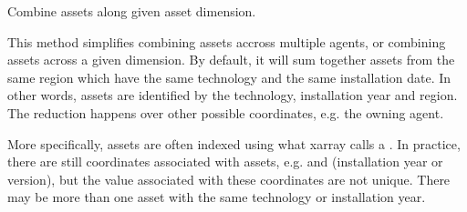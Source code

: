 \documentclass[letterpaper,10pt,english]{sphinxmanual}
\begin{document}

\begin{fulllineitems}
\label{\detokenize{api:muse.utilities.reduce_assets}}
Combine assets along given asset dimension.

This method simplifies combining assets accross multiple agents, or combining assets
across a given dimension. By default, it will sum together assets from the same
region which have the same technology and the same installation date. In other
words, assets are identified by the technology, installation year and region. The
reduction happens over other possible coordinates, e.g. the owning agent.

More specifically, assets are often indexed using what xarray calls a . In practice, there are still coordinates associated with
assets, e.g.  and  (installation year or version), but the
value associated with these coordinates are not unique.  There may be more than one
asset with the same technology or installation year.


\end{fulllineitems}
\end{document}

